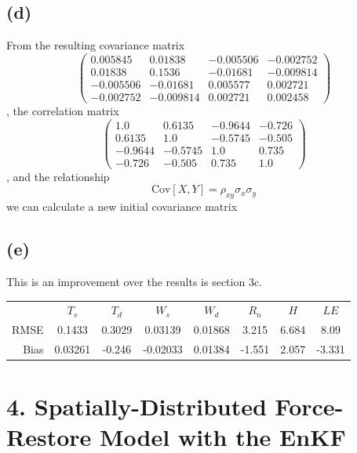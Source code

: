 \documentclass[letterpaper]{tufte-handout}
\begin{document}
\subsection{(d)}
{\small
  
}
From the resulting covariance matrix
\[\left(\begin{array}{cccc} 0.005845 & 0.01838 & -0.005506 & -0.002752\\ 0.01838 & 0.1536 & -0.01681 & -0.009814\\ -0.005506 & -0.01681 & 0.005577 & 0.002721\\ -0.002752 & -0.009814 & 0.002721 & 0.002458 \end{array}\right)\],
the correlation matrix
\[\left(\begin{array}{cccc} 1.0 & 0.6135 & -0.9644 & -0.726\\ 0.6135 & 1.0 & -0.5745 & -0.505\\ -0.9644 & -0.5745 & 1.0 & 0.735\\ -0.726 & -0.505 & 0.735 & 1.0 \end{array}\right)\],
and the relationship
\[\text{Cov}[X,Y] = \rho_{xy}\sigma_x\sigma_y\]
we can calculate a new initial covariance matrix


\subsection{(e)} This is an improvement over the results is section 3c.

\begin{table}
  \begin{tabular}{rccccccc} 
    &$T_s$ & $T_d$ & $W_s$ & $W_d$ & $R_n$ & $H$ & $LE$ \\
    RMSE &0.1433 & 0.3029 & 0.03139 & 0.01868 & 3.215 & 6.684 & 8.09\\
    Bias &0.03261 & -0.246 & -0.02033 & 0.01384 & -1.551 & 2.057 & -3.331
  \end{tabular}
\end{table}

\section{4. Spatially-Distributed Force-Restore Model with the EnKF}
\end{document}
